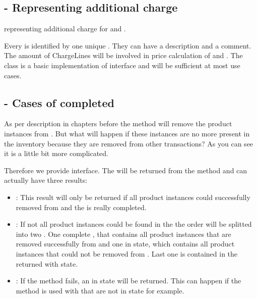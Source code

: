 \subsection{ - Representing additional charge}
 representing additional charge for  and . 

Every  is identified by one unique . They can have a description and a comment. The amount of ChargeLines will be involved in price calculation of  and . The  class is a basic implementation of  interface and will be sufficient at most use cases.

\subsection{ - Cases of completed }
As per description in chapters before the  method will remove the product instances from . But what will happen if these instances are no more present in the inventory because they are removed from other transactions? As you can see it is a little bit more complicated. 

Therefore we provide  interface. The  will be returned from the  method and can actually have three results:

\begin{itemize}
\item {}: This result will only be returned if all product instances could successfully removed from  and the  is really completed. 
\item {}: If not all product instances could be found in the  the order will be splitted into two . One complete , that contains all product instances that are removed successfully from  and one  in  state, which contains all product instances that could not be removed from . Last one is contained in the returned  with  state.
\item {}: If the  method fails, an  in  state will be returned. This can happen if the  method is used with  that are not in  state for example.
\end{itemize}

